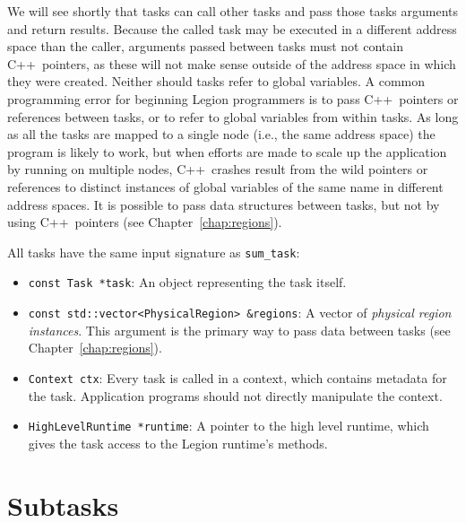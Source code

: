 \documentclass[11pt]{book}
\newcommand{\Cpp}{C++}
\begin{document}
We will see shortly that tasks can call other tasks and pass
those tasks arguments and return results.  Because the called task may
be executed in a different address space than the caller, arguments
passed between tasks must not contain \Cpp\ pointers, as these will
not make sense outside of the address space in which they were
created.  Neither should tasks refer to global variables. A common
programming error for beginning Legion programmers is to pass
\Cpp\ pointers or references between tasks, or to refer to global
variables from within tasks.  As long as all the tasks are mapped to a
single node (i.e., the same address space) the program is likely to
work, but when efforts are made to scale up the application by running
on multiple nodes, \Cpp\ crashes result from the wild pointers or
references to distinct instances of global variables of the same name
in different address spaces.  It is possible to pass data structures
between tasks, but not by using \Cpp\ pointers (see
Chapter~\ref{chap:regions}).

All tasks have the same input signature as {\tt sum\_task}:
\begin{itemize}

\item {\tt const Task *task}: An object representing the task itself. 

\item {\tt const std::vector<PhysicalRegion> \&regions}: A vector of {\em physical region instances}.  This argument is the
primary way to pass data between tasks (see Chapter~\ref{chap:regions}).

\item {\tt Context ctx}: Every task is called in a context, which contains metadata for the task.  Application programs
should not directly manipulate the context.

\item {\tt HighLevelRuntime *runtime}: A pointer to the high level runtime, which gives the task access to the Legion runtime's methods.

\end{itemize}

\section{Subtasks}
\label{sec:subtasks}
\end{document}
